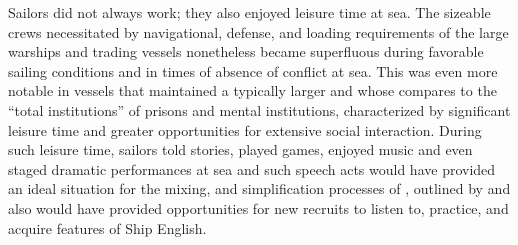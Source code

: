 Sailors did not always work; they also enjoyed leisure time at sea. The sizeable crews necessitated by navigational, defense, and loading requirements of the large warships and  trading vessels nonetheless became superfluous during favorable sailing conditions and in times of absence of conflict at sea. This was even more notable in  vessels that maintained a typically larger  and whose  \citet{Burg2001} compares to the “total institutions” of prisons and mental institutions, characterized by significant leisure time and greater opportunities for extensive social interaction. During such leisure time, sailors told stories, played games, enjoyed music and even staged dramatic performances at sea \citep[155]{Rediker2004} and such speech acts would have provided an ideal situation for the mixing,  and simplification processes of , outlined by \citet{Trudgill1986} and also would have provided opportunities for new recruits to listen to, practice, and acquire features of Ship English.

\begin{figure}

\end{figure}

